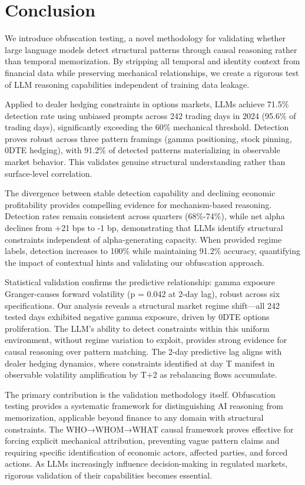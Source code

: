 \section{Conclusion}

We introduce obfuscation testing, a novel methodology for validating whether large language models detect structural patterns through causal reasoning rather than temporal memorization. By stripping all temporal and identity context from financial data while preserving mechanical relationships, we create a rigorous test of LLM reasoning capabilities independent of training data leakage.

Applied to dealer hedging constraints in options markets, LLMs achieve 71.5\% detection rate using unbiased prompts across 242 trading days in 2024 (95.6\% of trading days), significantly exceeding the 60\% mechanical threshold. Detection proves robust across three pattern framings (gamma positioning, stock pinning, 0DTE hedging), with 91.2\% of detected patterns materializing in observable market behavior. This validates genuine structural understanding rather than surface-level correlation.

The divergence between stable detection capability and declining economic profitability provides compelling evidence for mechanism-based reasoning. Detection rates remain consistent across quarters (68\%-74\%), while net alpha declines from +21 bps to -1 bp, demonstrating that LLMs identify structural constraints independent of alpha-generating capacity. When provided regime labels, detection increases to 100\% while maintaining 91.2\% accuracy, quantifying the impact of contextual hints and validating our obfuscation approach.

Statistical validation confirms the predictive relationship: gamma exposure Granger-causes forward volatility (p = 0.042 at 2-day lag), robust across six specifications. Our analysis reveals a structural market regime shift—all 242 tested days exhibited negative gamma exposure, driven by 0DTE options proliferation. The LLM's ability to detect constraints within this uniform environment, without regime variation to exploit, provides strong evidence for causal reasoning over pattern matching. The 2-day predictive lag aligns with dealer hedging dynamics, where constraints identified at day T manifest in observable volatility amplification by T+2 as rebalancing flows accumulate.

The primary contribution is the validation methodology itself. Obfuscation testing provides a systematic framework for distinguishing AI reasoning from memorization, applicable beyond finance to any domain with structural constraints. The WHO→WHOM→WHAT causal framework proves effective for forcing explicit mechanical attribution, preventing vague pattern claims and requiring specific identification of economic actors, affected parties, and forced actions. As LLMs increasingly influence decision-making in regulated markets, rigorous validation of their capabilities becomes essential.

